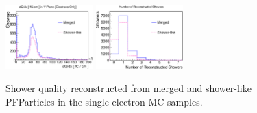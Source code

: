 \begin{figure}[htbp]
\begin{center}
\includegraphics[width=0.3\textwidth]{figs/ongoing/eminus/dQdxY.eps}
\includegraphics[width=0.3\textwidth]{figs/ongoing/eminus/NRecoShowers.eps}
\caption{Shower quality reconstructed from merged and shower-like PFParticles
in the single electron MC samples.}
\label{fig:shr_quality_merged_single_e}
\end{center}
\end{figure}
